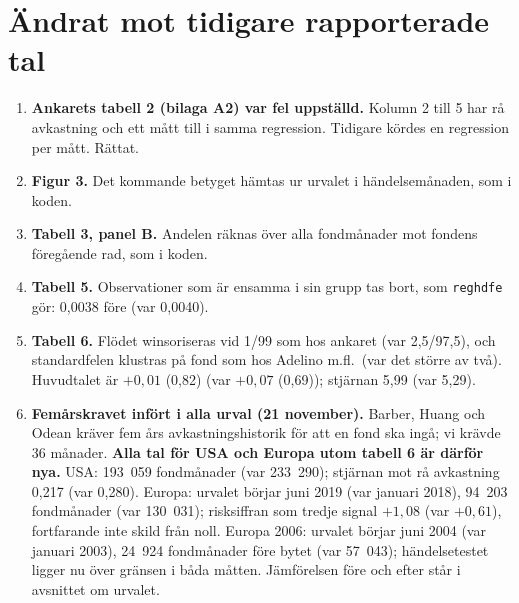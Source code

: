 \documentclass[10pt,a4paper]{article}
\newcommand{\kod}[1]{\texttt{#1}}
\begin{document}
\section*{Ändrat mot tidigare rapporterade tal}
\begin{enumerate}[leftmargin=*,itemsep=1pt]
\item \textbf{Ankarets tabell 2 (bilaga A2) var fel uppställd.} Kolumn 2 till 5 har rå avkastning och ett mått till i samma regression. Tidigare kördes en regression per mått. Rättat.
\item \textbf{Figur 3.} Det kommande betyget hämtas ur urvalet i händelsemånaden, som i koden.
\item \textbf{Tabell 3, panel B.} Andelen räknas över alla fondmånader mot fondens föregående rad, som i koden.
\item \textbf{Tabell 5.} Observationer som är ensamma i sin grupp tas bort, som \kod{reghdfe} gör: 0,0038 före (var 0,0040).
\item \textbf{Tabell 6.} Flödet winsoriseras vid 1/99 som hos ankaret (var 2,5/97,5), och standardfelen klustras på fond som hos Adelino m.fl.\ (var det större av två). Huvudtalet är $+0{,}01$ (0,82) (var $+0{,}07$ (0,69)); stjärnan 5,99 (var 5,29).
\item \textbf{Femårskravet infört i alla urval (21 november).} Barber, Huang och Odean kräver fem års avkastningshistorik för att en fond ska ingå; vi krävde 36 månader. \textbf{Alla tal för USA och Europa utom tabell 6 är därför nya.} USA: 193~059 fondmånader (var 233~290); stjärnan mot rå avkastning 0,217 (var 0,280). Europa: urvalet börjar juni 2019 (var januari 2018), 94~203 fondmånader (var 130~031); risksiffran som tredje signal $+1{,}08$ (var $+0{,}61$), fortfarande inte skild från noll. Europa 2006: urvalet börjar juni 2004 (var januari 2003), 24~924 fondmånader före bytet (var 57~043); händelsetestet ligger nu över gränsen i båda måtten. Jämförelsen före och efter står i avsnittet om urvalet.
\end{enumerate}
\end{document}
